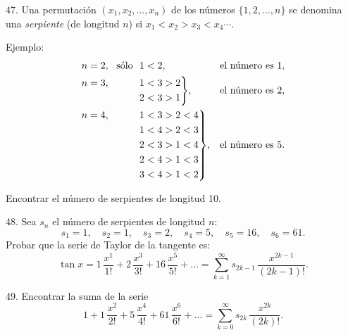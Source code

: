 \begin{problem}{47.}
	Una permutaci\'on $(x_1,x_2, \dotsc,x_n)$ de los n\'umeros $\{1, 2, \dotsc, n\}$ se denomina una
	\emph{serpiente} (de longitud $n$) si $x_1<x_2>x_3<x_4 \dotsb$.

	\begin{note}{Ejemplo:}
\begin{equation*}
			\begin{aligned}[t]
				&\begin{aligned}[t] n=2, \text{\ \ s\'olo\ \ } 1<2, \end{aligned} &&\text{el n\'umero es }1, \\
				&\hskip-\nulldelimiterspace\mathord{\left.\begin{aligned} n=3, \hphantom{\text{\ \ s\'olo\ \ }} 1&<3>2 \\
				2&<3>1\end{aligned} \right\}}, && \text{el n\'umero es }2, \\
				&\hskip-\nulldelimiterspace\mathord{\left.\begin{aligned} n=4, \hphantom{\text{\ \ s\'olo\ \ }} 1&<3>2<4 \\
				1&<4>2<3 \\
				2&<3>1<4 \\
				2&<4>1<3 \\
				3&<4>1<2\end{aligned} \right\}},
				&&\text{el n\'umero es }5. \\
			\end{aligned}
		\end{equation*}
	\end{note}
	Encontrar el n\'umero de serpientes de longitud 10.
\end{problem}

\begin{problem}{48.}
	Sea $s_n$ el n\'umero de serpientes de longitud $n$:
	\begin{equation*}
	s_1=1, \quad s_2=1, \quad s_3=2, \quad s_4=5, \quad s_5=16, \quad s_6=61.
	\end{equation*}
	Probar que la serie de Taylor de la tangente es:
	\begin{equation*}
		\tan x=1\, \frac{x^1}{1!}+2\, \frac{x^3}{3!}+16\, \frac{x^5}{5!}+\dots=
		\textstyle\sum\limits_{k=1}^{\infty} s_{2k-1}\, \frac{x^{2k-1}}{(2k-1)!}.
	\end{equation*}
\end{problem}

\begin{problem}{49.}
	Encontrar la suma de la serie
	\begin{equation*}
		1+1\, \frac{x^2}{2!}+5\, \frac{x^4}{4!}+61\, \frac{x^6}{6!}+\dots=
		\textstyle\sum\limits_{k=0}^{\infty} s_{2k}\,\frac{x^{2k}}{(2k)!}.
	\end{equation*}
\end{problem}

